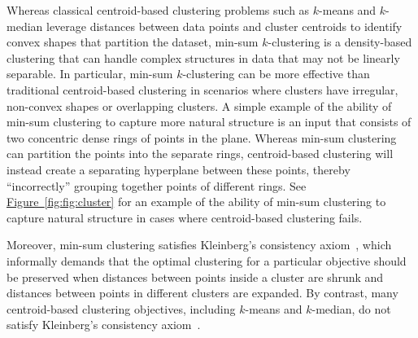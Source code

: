 \documentclass[11pt]{article}
\newcommand{\namedref}[2]{\hyperref[#2]{#1~\ref*{#2}}}
\newcommand{\figref}[1]{\namedref{Figure}{fig:#1}}
\begin{document}
Whereas classical centroid-based clustering problems such as $k$-means and $k$-median leverage distances between data points and cluster centroids to identify convex shapes that partition the dataset, min-sum $k$-clustering is a density-based clustering that can handle complex structures in data that may not be linearly separable. 
In particular, min-sum $k$-clustering can be more effective than traditional centroid-based clustering in scenarios where clusters have irregular, non-convex shapes or overlapping clusters.
A simple example of the ability of min-sum clustering to capture more natural structure is an input that consists of two concentric dense rings of points in the plane. 
Whereas min-sum clustering can partition the points into the separate rings, centroid-based clustering will instead create a separating hyperplane between these points, thereby ``incorrectly'' grouping together points of different rings. 
See \figref{fig:cluster} for an example of the ability of min-sum clustering to capture natural structure in cases where centroid-based clustering fails. 

Moreover, min-sum clustering satisfies Kleinberg\textquoteright{}s consistency axiom~\cite{Kleinberg02}, which informally demands that the optimal clustering for a particular objective should be preserved when distances between points inside a cluster are shrunk and distances between points in different clusters are expanded. 
By contrast, many centroid-based clustering objectives, including $k$-means and $k$-median, do not satisfy Kleinberg's consistency axiom~\cite{MahajanNV12}. 
\end{document}
